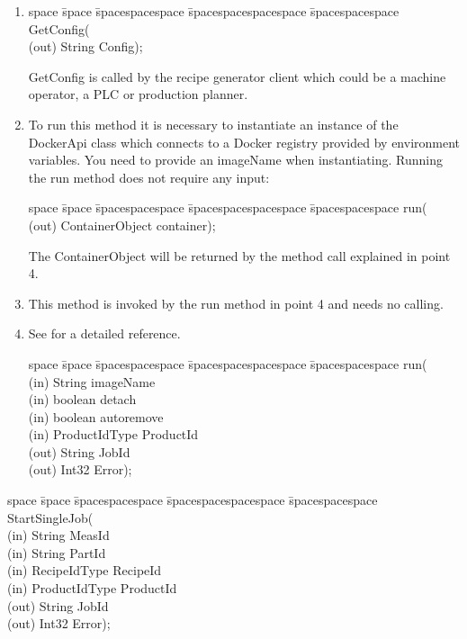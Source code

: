 \begin{enumerate}
    \item \begin{tabbing}
            space \= space \= spacespacespace \= spacespacespacespace \= spacespacespace \kill
            \>  GetConfig(\\
            \>  \>  (out)	 \> 	String           \> Config); 
        \end{tabbing}
        GetConfig is called by the recipe generator client which could be a machine operator, a PLC or production planner.
    \item To run this method it is necessary to instantiate an instance of the DockerApi class which connects to a Docker registry provided by environment variables. You need to provide an imageName when instantiating. Running the run method does not require any input: \begin{tabbing}
    space \= space \= spacespacespace \= spacespacespacespace \= spacespacespace \kill
    \>  run(\\
    \>  \>  (out)	 \> 	ContainerObject           \> container); 
    \end{tabbing}
    The ContainerObject will be returned by the method call explained in point 4.
    \item This method is invoked by the run method in point 4 and needs no calling.
    \item See \cite{LastvisitedMay4th2019DockerPython} for a detailed reference. \begin{tabbing}
    space \= space \= spacespacespace \= spacespacespacespace \= spacespacespace \kill
    \>  run(\\
    \>  \>  (in)	 \> 	String          \> imageName\\
    \>  \>  (in)	 \> 	boolean          \> detach\\
    \>  \>  (in)	 \> 	boolean    \> autoremove\\
    \>  \>  (in)	 \> 	ProductIdType   \> ProductId\\
    \>  \>  (out)	 \> 	String          \> JobId\\
    \>  \>  (out)	 \> 	Int32           \> Error); 
    \end{tabbing}
\end{enumerate}

\begin{tabbing}
    space \= space \= spacespacespace \= spacespacespacespace \= spacespacespace \kill
    \>  StartSingleJob(\\
    \>  \>  (in)	 \> 	String          \> MeasId\\
    \>  \>  (in)	 \> 	String          \> PartId\\
    \>  \>  (in)	 \> 	RecipeIdType    \> RecipeId\\
    \>  \>  (in)	 \> 	ProductIdType   \> ProductId\\
    \>  \>  (out)	 \> 	String          \> JobId\\
    \>  \>  (out)	 \> 	Int32           \> Error); 
\end{tabbing}




